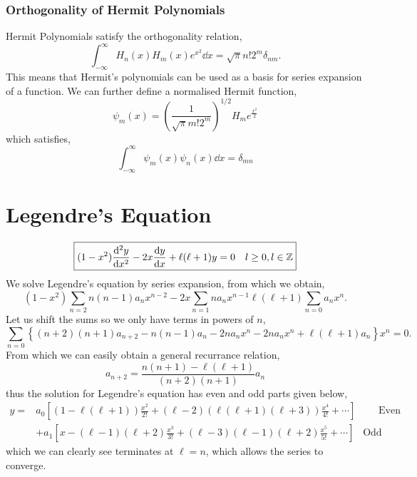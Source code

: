 \documentclass{book}
\begin{document}
\subsubsection{Orthogonality of Hermit Polynomials}
Hermit Polynomials satisfy the orthogonality relation,
\begin{equation}
	\int_{-\infty}^{\infty}H_n(x)H_m(x)e^{x^2}\dd{x} = \sqrt{\pi}n!2^m \delta_{nm}.
\end{equation}
This means that Hermit's polynomials can be used as a basis for series expansion of a function. We can further define a normalised Hermit function,
\begin{equation}
	\psi_m(x) = \left(\frac{1}{\sqrt{\pi}m!2^m}\right)^{1/2}H_me^{\frac{x^2}{2}}
\end{equation}
which satisfies,
\begin{equation}
	\int_{-\infty}^{\infty}\psi_m(x)\psi_n(x)\dd{x} = \delta_{mn}
\end{equation}
\section{Legendre's Equation}
\begin{equation}
	\boxed{(1-x^2)\dv[2]{y}{x} - 2x\dv{y}{x} + \ell(\ell + 1)y = 0 \hspace{10pt} l\geq 0, l \in \mathbb{Z}} \label{eq:legendre}
\end{equation}
We solve Legendre's equation by series expansion, from which we obtain,
\begin{equation}
	(1-x^2)\sum_{n=2} n(n-1)a_nx^{n-2} -2x\sum_{n=1}na_nx^{n-1} \ell(\ell + 1)\sum_{n=0}a_nx^n.
\end{equation}
Let us shift the sums so we only have terms in powers of $n$,
\begin{equation}
	\sum_{n=0} \left\{(n+2)(n+1)a_{n+2} - n(n-1)a_n - 2na_nx^n - 2na_nx^n + \ell(\ell + 1)a_n\right\}x^n = 0.
\end{equation}
From which we can easily obtain a general recurrance relation,
\begin{equation}
	\boxed{a_{n+2} = \frac{n(n+1) - \ell(\ell +1)}{(n+2)(n+1)}a_n}
\end{equation}
thus the solution for Legendre's equation has even and odd parts given below,
\begin{equation}
	\begin{split}
	y = & a_0\left[(1 - \ell(\ell +1))\frac{x^2}{2!} + (\ell - 2)(\ell(\ell +1)(\ell +3))\frac{x^4}{4!} + \cdots \right] \hspace{27pt} \text{Even} \\
	& + a_1\left[x - (\ell - 1)(\ell +2)\frac{x^3}{3!} + (\ell -3)(\ell -1)(\ell +2)\frac{x^5}{5!} + \cdots\right] \hspace{10pt} \text{Odd}
\end{split}
\end{equation}
which we can clearly see terminates at $\ell = n$, which allows the series to converge. 
\end{document}
